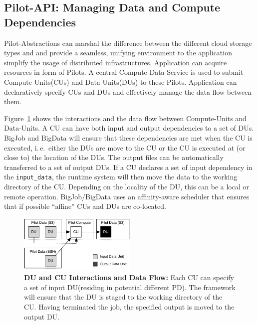 \documentclass[times]{cpeauth}
\newcommand{\jhanote}[1]{ {\textcolor{red} { ***shantenu: #1 }}}
\newcommand{\jhanote}[1]{}
\newcommand{\pilot}{Pilot\xspace}
\newcommand{\pilots}{Pilots\xspace}
\newcommand{\computedataservice}{Compute-Data Service\xspace}
\newcommand{\pd}{PD\xspace}
\newcommand{\computeunits}{Compute-Units\xspace}
\newcommand{\dataunits}{Data-Units\xspace}
\newcommand{\du}{DU\xspace}
\newcommand{\dus}{DUs\xspace}
\newcommand{\cu}{CU\xspace}
\newcommand{\cus}{CUs\xspace}
\begin{document}
 


\subsection{Pilot-API: Managing Data and Compute Dependencies}

\pilot-Abstractions can marshal the difference between the different cloud
storage types and and provide a seamless, unifying environment to the
application simplify the usage of distributed infrastructures. Application can 
acquire resources in form of \pilots. A central \computedataservice is used to 
submit \computeunits (\cus) and \dataunits (\dus) to these \pilots. 
Application  can declaratively specify \cus and \dus and effectively manage 
the data flow between them. 


Figure~\ref{fig:figures_data-flow} shows the interactions and the data flow
between \computeunits and \dataunits. A \cu can have both input and output
dependencies to a set of \dus. BigJob and BigData will ensure that these
dependencies are met when the \cu is executed, i.\,e.\ either the \dus are
move to the \cu or the \cu is executed at (or close to) the location of the
\dus. The output files can be automatically transferred to a set of output
\dus. If a \cu declares a set of input dependency in the \texttt{input\_data},
the runtime system will then move the data to the working directory of the
\cu. Depending on the locality of the \du, this can be a local or remote
operation. BigJob/BigData uses an affinity-aware scheduler that ensures that
if possible ``affine'' \cus and \dus are co-located.


\begin{figure}
	\centering
		\includegraphics[width=0.5\textwidth]{figures/data-flow.pdf}
	\caption{\textbf{DU and CU Interactions and Data Flow:} Each \cu can specify a set of input \du (residing in potential different \pd). The framework will ensure that the \du is staged to the working directory of the \cu. Having terminated the job, the specified output is moved to the output \du.}
	\label{fig:figures_data-flow}
\end{figure}
\end{document}
